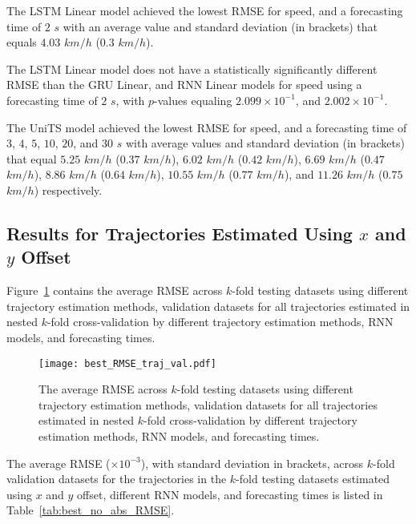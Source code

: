 The LSTM Linear model achieved the lowest RMSE for speed, and a forecasting time of $2$ $s$ with an average value and standard deviation (in brackets) that equals $4.03$ $km/h$ ($0.3$ $km/h$).

The LSTM Linear model does not have a statistically significantly different RMSE than the GRU Linear, and RNN Linear models for speed using a forecasting time of $2$ $s$, with $p$-values equaling $2.099 \times 10^{-1}$, and $2.002 \times 10^{-1}$.

The UniTS model achieved the lowest RMSE for speed, and a forecasting time of $3$, $4$, $5$, $10$, $20$, and $30$ $s$ with average values and standard deviation (in brackets) that equal $5.25$ $km/h$ ($0.37$ $km/h$), $6.02$ $km/h$ ($0.42$ $km/h$), $6.69$ $km/h$ ($0.47$ $km/h$), $8.86$ $km/h$ ($0.64$ $km/h$), $10.55$ $km/h$ ($0.77$ $km/h$), and $11.26$ $km/h$ ($0.75$ $km/h$) respectively.

\subsection{Results for Trajectories Estimated Using $x$ and $y$ Offset}

Figure~\ref{fig:best_RMSE_traj_val} contains the average RMSE across $k$-fold testing datasets using different trajectory estimation methods, validation datasets for all trajectories estimated in nested $k$-fold cross-validation by different trajectory estimation methods, RNN models, and forecasting times.

\begin{figure}[!ht]
	\centering
	\texttt{[image: best\_RMSE\_traj\_val.pdf]}
	\caption{The average RMSE across $k$-fold testing datasets using different trajectory estimation methods, validation datasets for all trajectories estimated in nested $k$-fold cross-validation by different trajectory estimation methods, RNN models, and forecasting times.}
	\label{fig:best_RMSE_traj_val}
\end{figure}

The average RMSE ($\times 10^{-3}$), with standard deviation in brackets, across $k$-fold validation datasets for the trajectories in the $k$-fold testing datasets estimated using $x$ and $y$ offset, different RNN models, and forecasting times is listed in Table~\ref{tab:best_no_abs_RMSE}.

